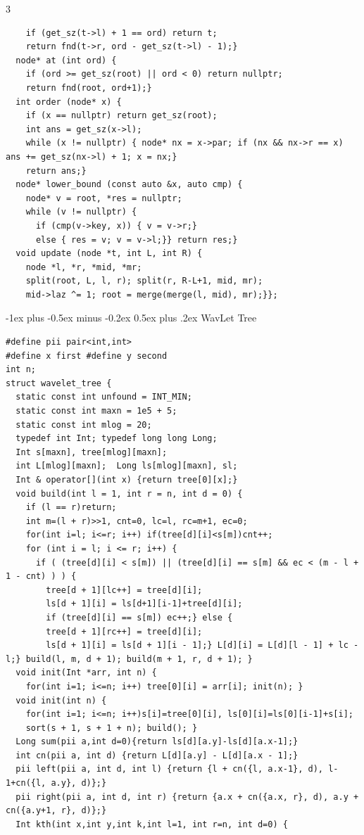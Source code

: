 \documentclass[8pt,a4paper,onesided]{article}
\makeatletter
\renewcommand{\subsection}{\@startsection{subsection}{2}{0mm}
    {-1ex plus -0.5ex minus -0.2ex} %
    {0.5ex plus .2ex}                %
    {\normalfont\large\bfseries}}    %
\makeatother
\begin{document}
\begin{multicols}{3}
\begin{verbatim}
    if (get_sz(t->l) + 1 == ord) return t;
    return fnd(t->r, ord - get_sz(t->l) - 1);}
  node* at (int ord) {
    if (ord >= get_sz(root) || ord < 0) return nullptr;
    return fnd(root, ord+1);}
  int order (node* x) {
    if (x == nullptr) return get_sz(root);
    int ans = get_sz(x->l);
    while (x != nullptr) { node* nx = x->par; if (nx && nx->r == x) ans += get_sz(nx->l) + 1; x = nx;}
    return ans;}
  node* lower_bound (const auto &x, auto cmp) {
    node* v = root, *res = nullptr;
    while (v != nullptr) {
      if (cmp(v->key, x)) { v = v->r;}
      else { res = v; v = v->l;}} return res;}
  void update (node *t, int L, int R) {
    node *l, *r, *mid, *mr;
    split(root, L, l, r); split(r, R-L+1, mid, mr);
    mid->laz ^= 1; root = merge(merge(l, mid), mr);}};
\end{verbatim}
\subsection{WavLet Tree}
\begin{verbatim}
#define pii pair<int,int>
#define x first #define y second
int n;
struct wavelet_tree {
  static const int unfound = INT_MIN;
  static const int maxn = 1e5 + 5;
  static const int mlog = 20;
  typedef int Int; typedef long long Long;
  Int s[maxn], tree[mlog][maxn];
  int L[mlog][maxn];  Long ls[mlog][maxn], sl;
  Int & operator[](int x) {return tree[0][x];}
  void build(int l = 1, int r = n, int d = 0) {
    if (l == r)return;
    int m=(l + r)>>1, cnt=0, lc=l, rc=m+1, ec=0;
    for(int i=l; i<=r; i++) if(tree[d][i]<s[m])cnt++;
    for (int i = l; i <= r; i++) {
      if ( (tree[d][i] < s[m]) || (tree[d][i] == s[m] && ec < (m - l + 1 - cnt) ) ) {
        tree[d + 1][lc++] = tree[d][i];
        ls[d + 1][i] = ls[d+1][i-1]+tree[d][i];
        if (tree[d][i] == s[m]) ec++;} else {
        tree[d + 1][rc++] = tree[d][i];
        ls[d + 1][i] = ls[d + 1][i - 1];} L[d][i] = L[d][l - 1] + lc - l;} build(l, m, d + 1); build(m + 1, r, d + 1); }
  void init(Int *arr, int n) {
    for(int i=1; i<=n; i++) tree[0][i] = arr[i]; init(n); }
  void init(int n) {
    for(int i=1; i<=n; i++)s[i]=tree[0][i], ls[0][i]=ls[0][i-1]+s[i];
    sort(s + 1, s + 1 + n); build(); }
  Long sum(pii a,int d=0){return ls[d][a.y]-ls[d][a.x-1];}
  int cn(pii a, int d) {return L[d][a.y] - L[d][a.x - 1];}
  pii left(pii a, int d, int l) {return {l + cn({l, a.x-1}, d), l-1+cn({l, a.y}, d)};}
  pii right(pii a, int d, int r) {return {a.x + cn({a.x, r}, d), a.y + cn({a.y+1, r}, d)};}
  Int kth(int x,int y,int k,int l=1, int r=n, int d=0) {

\end{verbatim}
\end{multicols}
\end{document}
